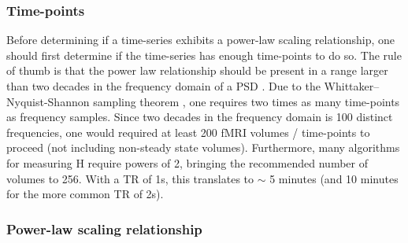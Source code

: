 \documentclass[
  sn-vancouver,
  Numbered,
  referee,
  lineno]{sn-jnl}
\begin{document}
\subsubsection{Time-points}\label{time-points}

Before determining if a time-series exhibits a power-law scaling
relationship, one should first determine if the time-series has enough
time-points to do so. The rule of thumb is that the power law
relationship should be present in a range larger than two decades in the
frequency domain of a PSD \citep{ekePhysiologicalTimeSeries2000}. Due to
the Whittaker--Nyquist-Shannon sampling theorem
\citep{shannonCommunicationPresenceNoise1949}, one requires two times as
many time-points as frequency samples. Since two decades in the
frequency domain is 100 distinct frequencies, one would required at
least 200 fMRI volumes / time-points to proceed (not including
non-steady state volumes). Furthermore, many algorithms for measuring H
require powers of 2, bringing the recommended number of volumes to 256.
With a TR of 1s, this translates to \(\sim\) 5 minutes (and 10 minutes
for the more common TR of 2s).

\subsubsection{Power-law scaling
relationship}\label{power-law-scaling-relationship-1}
\end{document}
